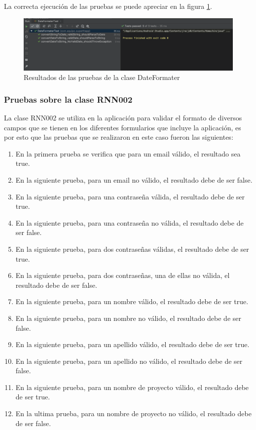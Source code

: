 La correcta ejecución de las pruebas se puede apreciar en la figura \ref{fig:dateTest}.

\begin{figure}[h]
	\centering
	\includegraphics[width=450px]{capitulo6/unitarias/img/dateTest.png}
	\caption{Resultados de las pruebas de la clase DateFormater}
	\label{fig:dateTest}
\end{figure}

\subsubsection{Pruebas sobre la clase RNN002}
La clase RNN002 se utiliza en la aplicación para validar el formato de diversos campos que se tienen en los diferentes formularios que incluye la aplicación, es por esto que las pruebas que se realizaron en este caso fueron las siguientes:

\begin{enumerate}
	\item En la primera prueba se verifica que para un email válido, el resultado sea true.
	\item En la siguiente prueba, para un email no válido, el resultado debe de ser false.
	\item En la siguiente prueba, para una contraseña válida, el resultado debe de ser true.
	\item En la siguiente prueba, para una contraseña no válida, el resultado debe de ser false.
	\item En la siguiente prueba, para dos contraseñas válidas, el resultado debe de ser true.
	\item En la siguiente prueba, para dos contraseñas, una de ellas no válida, el resultado debe de ser false.
	\item En la siguiente prueba, para un nombre válido, el resultado debe de ser true.
	\item En la siguiente prueba, para un nombre no válido, el resultado debe de ser false.
	\item En la siguiente prueba, para un apellido válido, el resultado debe de ser true.
	\item En la siguiente prueba, para un apellido no válido, el resultado debe de ser false.
	\item En la siguiente prueba, para un nombre de proyecto válido, el resultado debe de ser true.
	\item En la ultima prueba, para un nombre de proyecto no válido, el resultado debe de ser false.
\end{enumerate}

